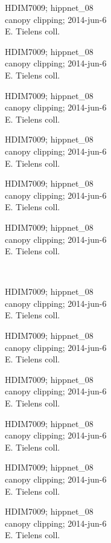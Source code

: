 \documentclass[2pt]{extarticle}
\begin{document}
\noindent
\parbox{0.16\textwidth}{\tiny \raggedright \rule[-0.3\baselineskip]{0pt}{10pt}HDIM7009; hippnet\_08\\ canopy clipping; 2014-jun-6\\ E. Tielens coll.}
\parbox{0.16\textwidth}{\tiny \raggedright \rule[-0.3\baselineskip]{0pt}{10pt}HDIM7009; hippnet\_08\\ canopy clipping; 2014-jun-6\\ E. Tielens coll.}
\parbox{0.16\textwidth}{\tiny \raggedright \rule[-0.3\baselineskip]{0pt}{10pt}HDIM7009; hippnet\_08\\ canopy clipping; 2014-jun-6\\ E. Tielens coll.}
\parbox{0.16\textwidth}{\tiny \raggedright \rule[-0.3\baselineskip]{0pt}{10pt}HDIM7009; hippnet\_08\\ canopy clipping; 2014-jun-6\\ E. Tielens coll.}
\parbox{0.16\textwidth}{\tiny \raggedright \rule[-0.3\baselineskip]{0pt}{10pt}HDIM7009; hippnet\_08\\ canopy clipping; 2014-jun-6\\ E. Tielens coll.}
\parbox{0.16\textwidth}{\tiny \raggedright \rule[-0.3\baselineskip]{0pt}{10pt}HDIM7009; hippnet\_08\\ canopy clipping; 2014-jun-6\\ E. Tielens coll.} \\ 
\vspace{0.001in} 

\noindent
\parbox{0.16\textwidth}{\tiny \raggedright \rule[-0.3\baselineskip]{0pt}{10pt}HDIM7009; hippnet\_08\\ canopy clipping; 2014-jun-6\\ E. Tielens coll.}
\parbox{0.16\textwidth}{\tiny \raggedright \rule[-0.3\baselineskip]{0pt}{10pt}HDIM7009; hippnet\_08\\ canopy clipping; 2014-jun-6\\ E. Tielens coll.}
\parbox{0.16\textwidth}{\tiny \raggedright \rule[-0.3\baselineskip]{0pt}{10pt}HDIM7009; hippnet\_08\\ canopy clipping; 2014-jun-6\\ E. Tielens coll.}
\parbox{0.16\textwidth}{\tiny \raggedright \rule[-0.3\baselineskip]{0pt}{10pt}HDIM7009; hippnet\_08\\ canopy clipping; 2014-jun-6\\ E. Tielens coll.}
\parbox{0.16\textwidth}{\tiny \raggedright \rule[-0.3\baselineskip]{0pt}{10pt}HDIM7009; hippnet\_08\\ canopy clipping; 2014-jun-6\\ E. Tielens coll.}
\parbox{0.16\textwidth}{\tiny \raggedright \rule[-0.3\baselineskip]{0pt}{10pt}HDIM7009; hippnet\_08\\ canopy clipping; 2014-jun-6\\ E. Tielens coll.} \\ 
\vspace{0.001in} 
\end{document}

